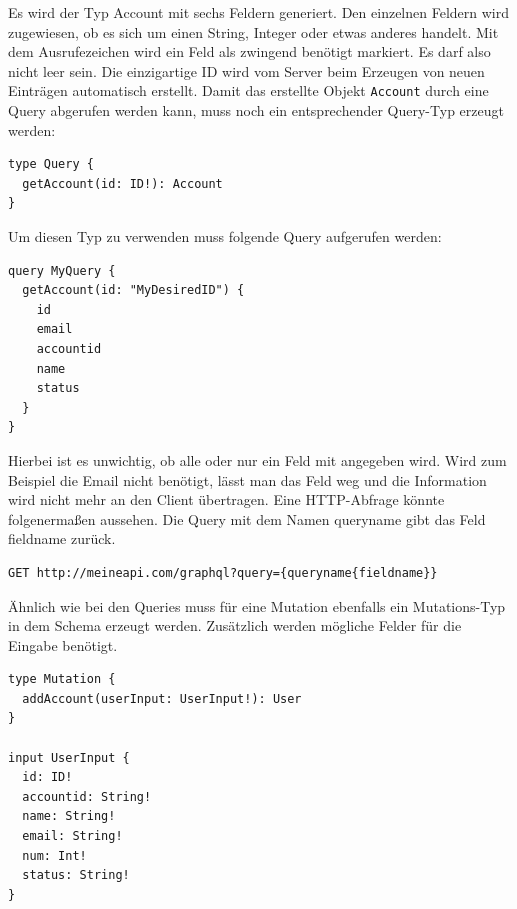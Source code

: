 Es wird der Typ Account mit sechs Feldern generiert.
Den einzelnen Feldern wird zugewiesen, ob es sich um einen String, Integer oder etwas anderes handelt.
Mit dem Ausrufezeichen wird ein Feld als zwingend benötigt markiert.
Es darf also nicht leer sein. Die einzigartige ID wird vom Server beim Erzeugen von neuen Einträgen automatisch erstellt.
Damit das erstellte Objekt \verb+Account+ durch eine Query abgerufen werden kann, muss noch ein entsprechender Query-Typ erzeugt werden:

\begin{lstlisting}[basicstyle=\ttfamily, breaklines=true , frame = single, backgroundcolor=\color{flashwhite} ]
type Query {
  getAccount(id: ID!): Account
}

\end{lstlisting}

Um diesen Typ zu verwenden muss folgende Query aufgerufen werden:

\begin{lstlisting}[basicstyle=\ttfamily, breaklines=true , frame = single, backgroundcolor=\color{flashwhite} ]
query MyQuery {
  getAccount(id: "MyDesiredID") {
    id
    email
    accountid
    name
    status
  }
}

\end{lstlisting}

Hierbei ist es unwichtig, ob alle oder nur ein Feld mit angegeben wird.
Wird zum Beispiel die Email nicht benötigt, lässt man das Feld weg und die Information wird nicht mehr an den Client übertragen.\cite{GraphQL1}
Eine HTTP-Abfrage könnte folgenermaßen aussehen.
Die Query mit dem Namen \glqq queryname \grqq{} gibt das Feld \glqq fieldname \grqq{} zurück. \cite{GraphQLHTTP}

\begin{lstlisting}[basicstyle=\ttfamily, breaklines=true , frame = single, backgroundcolor=\color{flashwhite} ]
GET http://meineapi.com/graphql?query={queryname{fieldname}}

\end{lstlisting}

Ähnlich wie bei den Queries muss für eine Mutation ebenfalls ein Mutations-Typ in dem Schema erzeugt werden.
Zusätzlich werden mögliche Felder für die Eingabe benötigt.


\begin{lstlisting}[basicstyle=\ttfamily, breaklines=true , frame = single, backgroundcolor=\color{flashwhite} ]
type Mutation {
  addAccount(userInput: UserInput!): User
}

input UserInput {
  id: ID!
  accountid: String!
  name: String!
  email: String!
  num: Int!
  status: String!
}
\end{lstlisting}

